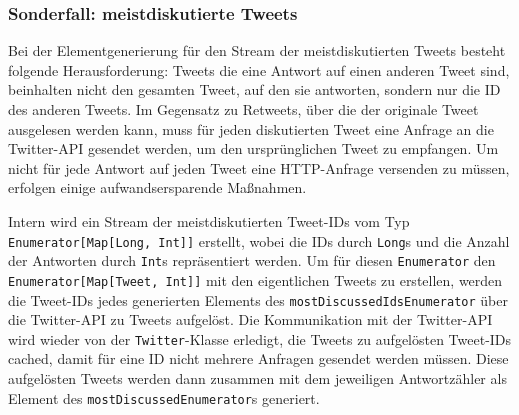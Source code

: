 
\subsubsection{Sonderfall: meistdiskutierte Tweets} %
\label{ssub:sonderfall_meistdiskutierte_tweets}

Bei der Elementgenerierung für den Stream der meistdiskutierten Tweets besteht folgende Herausforderung:
Tweets die eine Antwort auf einen anderen Tweet sind, beinhalten nicht den gesamten Tweet, auf den sie antworten, sondern nur die ID des anderen Tweets.
Im Gegensatz zu Retweets, über die der originale Tweet ausgelesen werden kann, muss für jeden diskutierten Tweet eine Anfrage an die Twitter-API gesendet werden, um den ursprünglichen Tweet zu empfangen.
Um nicht für jede Antwort auf jeden Tweet eine HTTP-Anfrage versenden zu müssen, erfolgen einige aufwandsersparende Maßnahmen.

Intern wird ein Stream der meistdiskutierten Tweet-IDs vom Typ \lstinline|Enumerator[Map[Long, Int]]| erstellt, wobei die IDs durch \lstinline|Long|s und die Anzahl der Antworten durch \lstinline|Int|s repräsentiert werden.
Um für diesen \lstinline|Enumerator| den \lstinline|Enumerator[Map[Tweet, Int]]| mit den eigentlichen Tweets zu erstellen, werden die Tweet-IDs jedes generierten Elements des \lstinline|mostDiscussedIdsEnumerator| über die Twitter-API zu Tweets aufgelöst.
Die Kommunikation mit der Twitter-API wird wieder von der \lstinline|Twitter|-Klasse erledigt, die Tweets zu aufgelösten Tweet-IDs cached, damit für eine ID nicht mehrere Anfragen gesendet werden müssen.
Diese aufgelösten Tweets werden dann zusammen mit dem jeweiligen Antwortzähler als Element des \lstinline|mostDiscussedEnumerator|s generiert.

